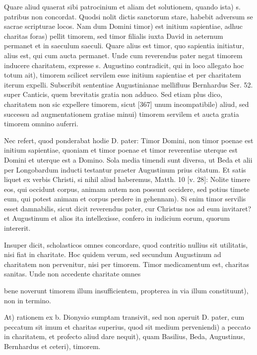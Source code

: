 Quare aliud quaerat sibi patrocinium et aliam det solutionem, quando ista) s. patribus non concordat. Quodsi nolit dictis sanctorum stare, habebit adversum se sacrae scripturae locos. Nam dum Domini timor) est initium sapientiae, adhuc charitas foras) pellit timorem, sed timor filialis iuxta David in aeternum permanet et in saeculum saeculi. Quare alius est timor, quo sapientia initiatur, alius est, qui cum aucta permanet. Unde cum reverendus pater negat timorem inducere charitatem, expresse s. Augustino contradicit, qui in loco allegato hoc totum ait), timorem scilicet servilem esse initium sapientiae et per charitatem iterum expelli. Subscribit sententiae Augustinianae mellifluus Bernhardus Ser. 52. super Canticis, quem brevitatis gratia non adduco. Sed etiam plus dico, charitatem non sic expellere timorem, sicut [367] unum incompatibile) aliud, sed successu ad augmentationem gratiae minui) timorem servilem et aucta gratia timorem omnino auferri.

Nec refert, quod ponderabat hodie D. pater: Timor Domini, non timor poenae est initium sapientiae, quoniam et timor poenae et timor reverentiae uterque est Domini et uterque est a Domino. Sola media timendi sunt diversa, ut Beda et alii per Longobardum inducti testantur praeter Augustinum prius citatum. Et satis liquet ex verbis Christi, si nihil aliud haberemus, Matth. 10 [v. 28]: Nolite timere eos, qui occidunt corpus, animam autem non possunt occidere, sed potius timete eum, qui potest animam et corpus perdere in gehennam). Si enim timor servilis esset damnabilis, sicut dicit reverendus pater, cur Christus nos ad eum invitaret? et Augustinum et alios ita intellexisse, confero in iudicium eorum, quorum intererit.

Insuper dicit, scholasticos omnes concordare, quod contritio nullius sit utilitatis, nisi fiat in charitate. Hoc quidem verum, sed secundum Augustinum ad charitatem non pervenitur, nisi per timorem. Timor medicamentum est, charitas sanitas. Unde non accedente charitate omnes

bene noverunt timorem illum insufficientem, propterea in via illum constituunt), non in termino.

At) rationem ex b. Dionysio sumptam transivit, sed non aperuit D. pater, cum peccatum sit imum et charitas superius, quod sit medium perveniendi) a peccato in charitatem, et profecto aliud dare nequit), quam Basilius, Beda, Augustinus, Bernhardus et ceteri), timorem.

